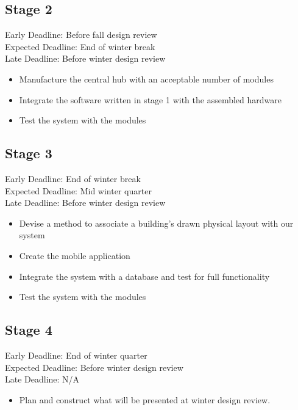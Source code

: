 \documentclass{article}
\begin{document}
\subsection{Stage 2}
Early Deadline: Before fall design review \\
Expected Deadline: End of winter break \\
Late Deadline: Before winter design review \\
\begin{itemize}
\item Manufacture the central hub with an acceptable number of modules
\item Integrate the software written in stage 1 with the assembled hardware
\item Test the system with the modules
\end{itemize}

\subsection{Stage 3}
Early Deadline: End of winter break \\
Expected Deadline: Mid winter quarter \\
Late Deadline: Before winter design review \\
\begin{itemize}
\item Devise a method to associate a building's drawn physical layout with our system
\item Create the mobile application
\item Integrate the system with a database and test for full functionality
\item Test the system with the modules
\end{itemize}

\subsection{Stage 4}
Early Deadline: End of winter quarter \\
Expected Deadline: Before winter design review \\
Late Deadline: N/A \\
\begin{itemize}
\item Plan and construct what will be presented at winter design review.
\end{itemize}
\end{document}
